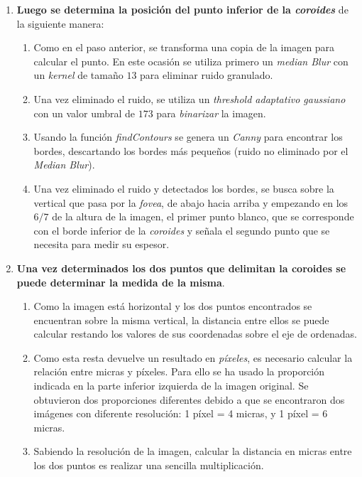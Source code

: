 \begin{enumerate}
\begin{enumerate}[label*=\arabic*.]
  \item \textbf{Luego se determina la posición del punto inferior de
      la \emph{\gls{coroides}}} de la siguiente manera:
    \begin{enumerate}[label*=\arabic*.]
    \item Como en el paso anterior, se transforma una copia de la
      imagen para calcular el punto. En este ocasión se utiliza
      primero un \emph{median Blur} con un \emph{kernel} de tamaño
      $13$ para eliminar ruido granulado.
    \item Una vez eliminado el ruido, se utiliza un \emph{threshold
        adaptativo
        gaussiano} con
      un valor umbral de $173$ para \emph{binarizar} la imagen.
    \item Usando la función
      \emph{findContours} se genera un
      \emph{Canny} para encontrar los
      bordes, descartando los bordes más pequeños (ruido no eliminado
      por el \emph{Median Blur}).
    \item Una vez eliminado el ruido y detectados los bordes, se busca
      sobre la vertical que pasa por la \emph{\gls{fovea}}, de abajo hacia
      arriba y empezando en los $6/7$ de la altura de la imagen, el
      primer punto blanco, que se corresponde con el borde inferior de
      la \emph{\gls{coroides}} y señala el segundo punto que se necesita
      para medir su espesor.
    \end{enumerate}
  \item \textbf{Una vez determinados los dos puntos que delimitan la
      \gls{coroides} se puede determinar la medida de la misma}.
    \begin{enumerate}[label*=\arabic*.]
    \item Como la imagen está horizontal y los dos puntos encontrados
      se encuentran sobre la misma vertical, la distancia entre ellos
      se puede calcular restando los valores de sus coordenadas sobre
      el eje de ordenadas.
    \item Como esta resta devuelve un resultado en \emph{píxeles}, es
      necesario calcular la relación entre micras y píxeles. Para ello
      se ha usado la proporción indicada en la parte inferior
      izquierda de la imagen original. Se obtuvieron dos proporciones
      diferentes debido a que se encontraron dos imágenes con diferente
      resolución: 1 píxel = 4 micras, y 1 píxel = 6 micras.
    \item Sabiendo la resolución de la imagen, calcular la distancia en
      micras entre los dos puntos es realizar una sencilla multiplicación.
    \end{enumerate}
  \end{enumerate}
\end{enumerate}

